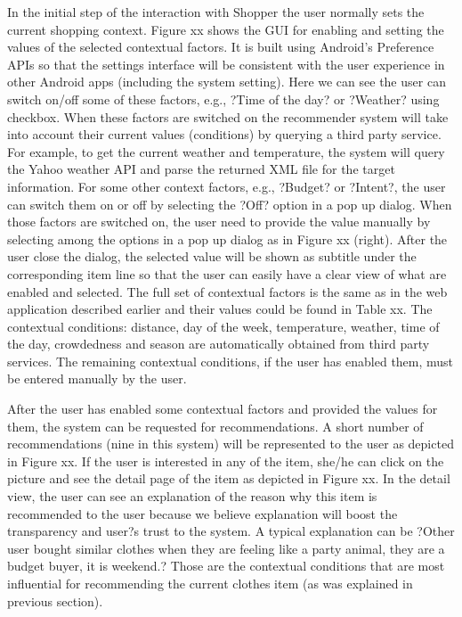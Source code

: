 In the initial step of the interaction with Shopper the user normally sets the current shopping context. Figure xx shows the GUI for enabling and setting the values of the selected contextual factors. It is built using Android's Preference APIs so that the settings interface will be consistent with the user experience in other Android apps (including the system setting). Here we can see the user can switch on/off some of these factors, e.g., ?Time of the day?  or ?Weather? using checkbox. When these factors are switched on the recommender system will take into account their current values (conditions) by querying a third party service. For example, to get the current weather and temperature, the system will query the Yahoo weather API and parse the returned XML file for the target information. For some other context factors, e.g., ?Budget? or ?Intent?, the user can switch them on or off by selecting the ?Off? option in a pop up dialog. When those factors are switched on, the user need to provide the value manually by selecting among the options in a pop up dialog as in Figure xx (right). After the user close the dialog, the selected value will be shown as subtitle under the corresponding item line so that the user can easily have a clear view of what are enabled and selected. The full set of contextual factors is the same as in the web application described earlier and their values could be found in Table xx. The contextual conditions: distance, day of the week, temperature, weather, time of the day, crowdedness and season are automatically obtained from third party services. The remaining contextual conditions, if the user has enabled them, must be entered manually by the user.

After the user has enabled some contextual factors and provided the values for them, the system can be requested for recommendations. A short number of recommendations (nine in this system) will be represented to the user as depicted in Figure xx. If the user is interested in any of the item, she/he can click on the picture and see the detail page of the item as depicted in Figure xx. In the detail view, the user can see an explanation of the reason why this item is recommended to the user because we believe explanation will boost the transparency and user?s trust to the system. A typical explanation can be ?Other user bought similar clothes when they are feeling like a party animal, they are a budget buyer, it is weekend.? Those are the contextual conditions that are most influential for recommending the current clothes item (as was explained in previous section). 

